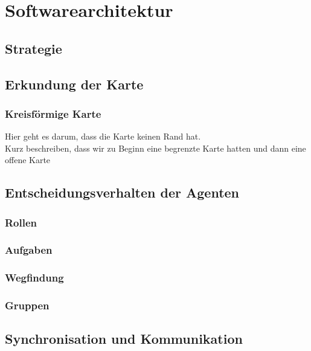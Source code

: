 \chapter{Softwarearchitektur}

\section{Strategie}


\section{Erkundung der Karte}

\subsection{Kreisförmige Karte}

Hier geht es darum, dass die Karte keinen Rand hat. \\
Kurz beschreiben, dass wir zu Beginn eine begrenzte Karte hatten und dann eine offene Karte

\section{Entscheidungsverhalten der Agenten}

\subsection{Rollen}

\subsection{Aufgaben}

\subsection{Wegfindung}

\subsection{Gruppen}


\section{Synchronisation und Kommunikation}